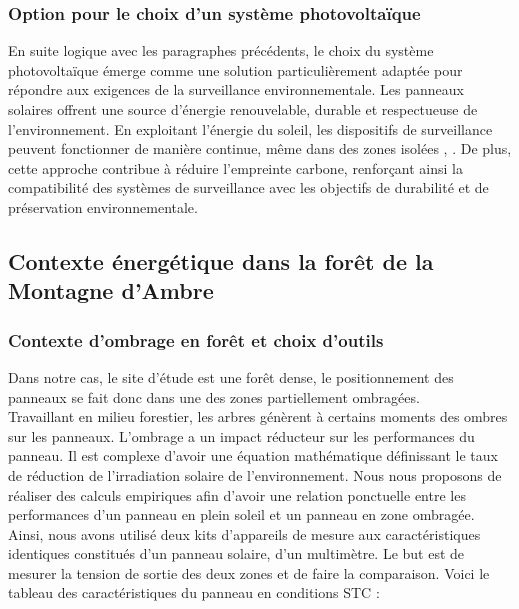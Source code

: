 \subsubsection{Option pour le choix d’un système photovoltaïque}
En suite logique avec les paragraphes précédents, le choix du système photovoltaïque émerge comme une solution particulièrement adaptée pour répondre aux exigences de la surveillance environnementale. Les panneaux solaires offrent une source d'énergie renouvelable, durable et respectueuse de l'environnement. En exploitant l'énergie du soleil, les dispositifs de surveillance peuvent fonctionner de manière continue, même dans des zones isolées \cite{72} , \cite{73}. De plus, cette approche contribue à réduire l'empreinte carbone, renforçant ainsi la compatibilité des systèmes de surveillance avec les objectifs de durabilité et de préservation environnementale.

\subsection{Contexte énergétique dans la forêt de la Montagne d’Ambre}
\subsubsection{Contexte d'ombrage en forêt et choix d’outils}
Dans notre cas, le site d'étude est une forêt dense, le positionnement des panneaux se fait donc dans une des zones partiellement ombragées.
\\

Travaillant en milieu forestier, les arbres génèrent à certains moments des ombres sur les panneaux. L'ombrage a un impact réducteur sur les performances du panneau\cite{74}. Il est complexe d'avoir une équation mathématique définissant le taux de réduction de l'irradiation solaire de l'environnement. Nous nous proposons de réaliser des calculs empiriques afin d'avoir une relation ponctuelle entre les performances d'un panneau en plein soleil et un panneau en zone ombragée.
Ainsi, nous avons utilisé deux kits d'appareils de mesure aux caractéristiques identiques constitués d'un panneau solaire, d'un multimètre. Le but est de mesurer la tension de sortie des deux zones et de faire la comparaison. Voici le tableau des caractéristiques du panneau en conditions STC :


